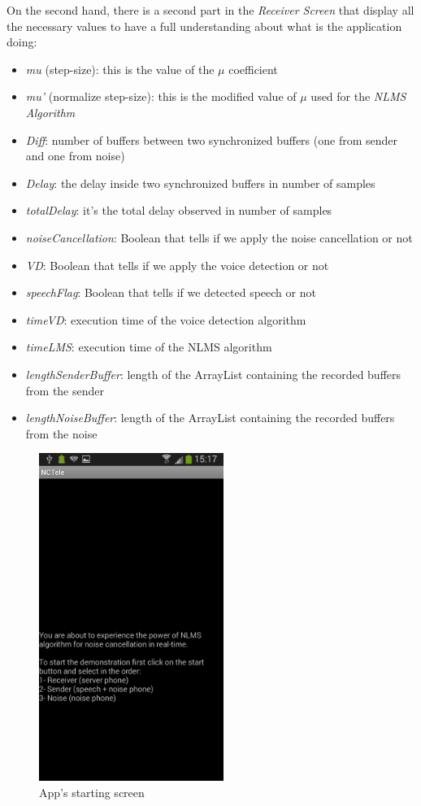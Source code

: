 \documentclass[11pt,a4paper,english]{book}  %
\theoremstyle{definition}  %
\theoremstyle{plain}  %
\theoremstyle{remark}  %
\begin{document}
	On the second hand, there is a second part in the \textit{Receiver Screen} that display all the necessary values to have a full understanding about what is the application doing:	
	
	\begin{itemize}
	\item \textit{mu} (step-size): this is the value of the $\mu$ coefficient
	\item \textit{mu'} (normalize step-size): this is the modified value of $\mu$ used for the  \textit{NLMS Algorithm}
	\item \textit{Diff}: number of buffers between two synchronized buffers (one from sender and one from noise)
	\item \textit{Delay}: the delay inside two synchronized buffers in number of samples
	\item \textit{totalDelay}: it’s the total delay observed in number of samples
	\item \textit{noiseCancellation}: Boolean that tells if we apply the noise cancellation or not
	\item \textit{VD}: Boolean that tells if we apply the voice detection or not
	\item \textit{speechFlag}: Boolean that tells if we detected speech or not
	\item \textit{timeVD}: execution time of the voice detection algorithm
	\item \textit{timeLMS}: execution time of the NLMS algorithm
	\item\textit{lengthSenderBuffer}: length of the ArrayList containing the recorded buffers from the sender
	\item \textit{lengthNoiseBuffer}: length of the ArrayList containing the recorded buffers from the noise
	\end{itemize}

	
	
		\begin{figure}[h]
		\centering
		\includegraphics[width=6cm]{images/android/startingscreen.jpg}
		\caption{App's starting screen}
		\label{fig:starting}
		\end{figure}
		
\end{document}
